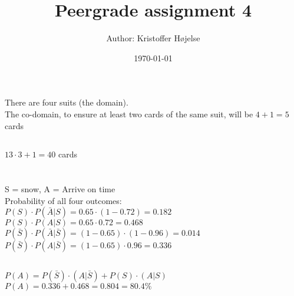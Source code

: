 \documentclass[a4paper,11pt]{article}
\title{Peergrade assignment 4}
\author{Author: Kristoffer Højelse}
\date{\today}
\begin{document}
 

\maketitle

\section{}

\subsection{}

There are four suits (the domain). \\

The co-domain, to ensure at least two cards of the same suit, will be
$4 + 1 = 5$ cards

\subsection{}

$13 \cdot 3 + 1 = 40$ cards

\section{}

S = snow, A = Arrive on time\\

\noindent Probability of all four outcomes: \\

$P(S) \cdot P(\bar A|S) = 0.65 \cdot (1-0.72) = 0.182$ \\

$P(S) \cdot P(A|S) = 0.65 \cdot 0.72 = 0.468$ \\

$P(\bar S) \cdot P(\bar A|\bar S) = (1 - 0.65) \cdot (1 - 0.96) = 0.014$ \\

$P(\bar S) \cdot P(A|\bar S) = (1-0.65) \cdot 0.96 = 0.336$

\subsection{}

$P(A) = P(\bar S) \cdot (A|\bar S) + P(S) \cdot (A|S)$ \\

$P(A) = 0.336 + 0.468 = 0.804 = 80.4\%$
\end{document}
